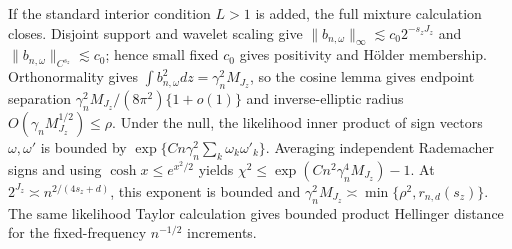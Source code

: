 If the standard interior condition \(L>1\) is added, the full mixture calculation closes.  Disjoint support and wavelet scaling give \(\|b_{n,\omega}\|_\infty\lesssim c_0 2^{-s_zJ_z}\) and \(\|b_{n,\omega}\|_{C^{s_z}}\lesssim c_0\); hence small fixed \(c_0\) gives positivity and H\"older membership.  Orthonormality gives \(\int b_{n,\omega}^2dz=\gamma_n^2M_{J_z}\), so the cosine lemma gives endpoint separation \(\gamma_n^2M_{J_z}/(8\pi^2)\{1+o(1)\}\) and inverse-elliptic radius \(O(\gamma_nM_{J_z}^{1/2})\le\rho\).  Under the null, the likelihood inner product of sign vectors \(\omega,\omega'\) is bounded by \(\exp\{Cn\gamma_n^2\sum_k\omega_k\omega'_k\}\).  Averaging independent Rademacher signs and using \(\cosh x\le e^{x^2/2}\) yields \(\chi^2\le\exp(Cn^2\gamma_n^4M_{J_z})-1\).  At \(2^{J_z}\asymp n^{2/(4s_z+d)}\), this exponent is bounded and \(\gamma_n^2M_{J_z}\asymp\min\{\rho^2,r_{n,d}(s_z)\}\).  The same likelihood Taylor calculation gives bounded product Hellinger distance for the fixed-frequency \(n^{-1/2}\) increments.